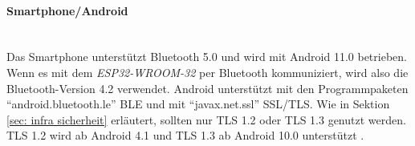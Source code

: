 \paragraph{Smartphone/Android} \mbox{} \vspace{0.2cm} \\
Das Smartphone unterstützt Bluetooth 5.0 und wird mit Android 11.0 betrieben. Wenn es mit dem \textit{ESP32-WROOM-32} per Bluetooth kommuniziert, wird also die Bluetooth-Version 4.2 verwendet. Android unterstützt mit den Programmpaketen "`android.bluetooth.le"' \cite{android_le} BLE und mit "`javax.net.ssl"' \cite{android_ssl} SSL/TLS. Wie in Sektion \ref{sec: infra sicherheit} erläutert, sollten nur TLS 1.2 oder TLS 1.3 genutzt werden. TLS 1.2 wird ab Android 4.1 und TLS 1.3 ab Android 10.0 unterstützt \cite{android_ssl_context}.